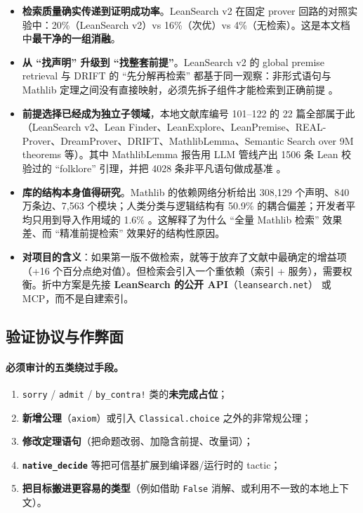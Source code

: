 \documentclass[UTF8,a4paper,11pt,fontset=windows]{ctexart}
\newcommand{\code}[1]{\texttt{#1}}
\begin{document}
\begin{itemize}
  \item \textbf{检索质量确实传递到证明成功率}。LeanSearch v2 在固定 prover 回路的对照实验中：20\%（LeanSearch v2）vs 16\%（次优）vs 4\%（无检索）\cite{leansearchv2}。这是本文档中\textbf{最干净的一组消融}。
  \item \textbf{从 ``找声明'' 升级到 ``找整套前提''}。LeanSearch v2 的 global premise retrieval 与 DRIFT 的 ``先分解再检索'' 都基于同一观察：非形式语句与 Mathlib 定理之间没有直接映射，必须先拆子组件才能检索到正确前提 \cite{leansearchv2,drift}。
  \item \textbf{前提选择已经成为独立子领域}，本地文献库编号 101--122 的 22 篇全部属于此（LeanSearch v2、Lean Finder、LeanExplore、LeanPremise、REAL-Prover、DreamProver、DRIFT、MathlibLemma、Semantic Search over 9M theorems 等）。其中 MathlibLemma 报告用 LLM 管线产出 1506 条 Lean 校验过的 ``folklore'' 引理，并把 4028 条非平凡语句做成基准 \cite{mathliblemma}。
  \item \textbf{库的结构本身值得研究}。Mathlib 的依赖网络分析给出 308{,}129 个声明、840 万条边、7{,}563 个模块；人类分类与逻辑结构有 50.9\% 的耦合偏差；开发者平均只用到导入作用域的 1.6\% \cite{mathlibnet}。这解释了为什么 ``全量 Mathlib 检索'' 效果差、而 ``精准前提检索'' 效果好的结构性原因。
  \item \textbf{对项目的含义}：如果第一版不做检索，就等于放弃了文献中最确定的增益项（+16 个百分点绝对值）。但检索会引入一个重依赖（索引 + 服务），需要权衡。折中方案是先接 \textbf{LeanSearch 的公开 API}（\code{leansearch.net}）\cite{leansearchv2} 或 MCP，而不是自建索引。
\end{itemize}

\subsection{验证协议与作弊面}\label{sec:verify}

\paragraph{必须审计的五类绕过手段。}
\begin{enumerate}
  \item \code{sorry} / \code{admit} / \code{by\_contra!} 类的\textbf{未完成占位}；
  \item \textbf{新增公理}（\code{axiom}）或引入 \code{Classical.choice} 之外的非常规公理；
  \item \textbf{修改定理语句}（把命题改弱、加隐含前提、改量词）；
  \item \textbf{\code{native\_decide}} 等把可信基扩展到编译器/运行时的 tactic；
  \item \textbf{把目标搬进更容易的类型}（例如借助 \code{False} 消解、或利用不一致的本地上下文）。
\end{enumerate}
\end{document}
